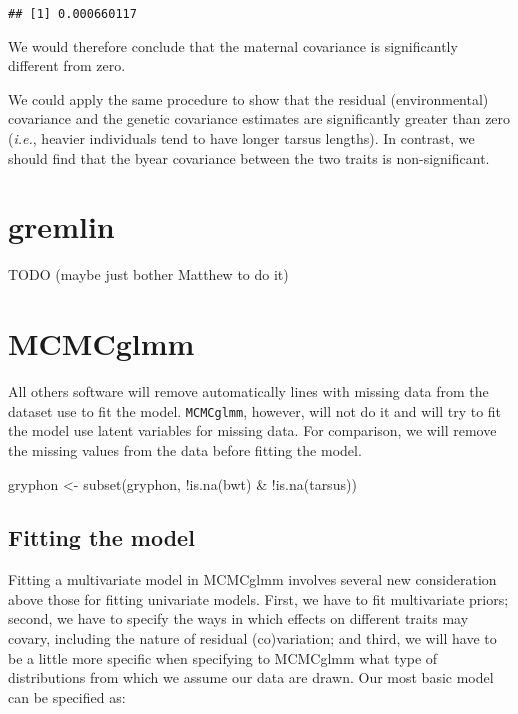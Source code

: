 \documentclass[
  12pt,
]{book}
\newenvironment{Shaded}{\begin{snugshade}}{\end{snugshade}}
\newcommand{\FunctionTok}[1]{\textcolor[rgb]{0.00,0.00,0.00}{#1}}
\newcommand{\NormalTok}[1]{#1}
\newcommand{\OtherTok}[1]{\textcolor[rgb]{0.56,0.35,0.01}{#1}}
\newcommand{\SpecialCharTok}[1]{\textcolor[rgb]{0.00,0.00,0.00}{#1}}
\begin{document}
\begin{verbatim}
## [1] 0.000660117
\end{verbatim}

We would therefore conclude that the maternal covariance is significantly different from zero.

We could apply the same procedure to show that the residual (environmental) covariance and the genetic covariance estimates are significantly greater than zero (\emph{i.e.}, heavier individuals tend to have longer tarsus lengths). In contrast, we should find that the byear covariance between the two traits is non-significant.

\hypertarget{gremlin-2}{%
\section{gremlin}\label{gremlin-2}}

TODO (maybe just bother Matthew to do it)

\hypertarget{mcmcglmm-2}{%
\section{MCMCglmm}\label{mcmcglmm-2}}

All others software will remove automatically lines with missing data from the dataset use to fit the model.
\texttt{MCMCglmm}, however, will not do it and will try to fit the model use latent variables for missing data.
For comparison, we will remove the missing values from the data before fitting the model.

\begin{Shaded}
\begin{Highlighting}[]
\NormalTok{gryphon }\OtherTok{\textless{}{-}} \FunctionTok{subset}\NormalTok{(gryphon, }\SpecialCharTok{!}\FunctionTok{is.na}\NormalTok{(bwt) }\SpecialCharTok{\&} \SpecialCharTok{!}\FunctionTok{is.na}\NormalTok{(tarsus))}
\end{Highlighting}
\end{Shaded}

\hypertarget{fitting-the-model}{%
\subsection{Fitting the model}\label{fitting-the-model}}

Fitting a multivariate model in MCMCglmm involves several new consideration above those for fitting univariate models. First, we have to fit multivariate priors; second, we have to specify the ways in which effects on different traits may covary, including the nature of residual (co)variation; and third, we will have to be a little more specific when specifying to MCMCglmm what type of distributions from which we assume our data are drawn. Our most basic model can be specified as:
\end{document}

